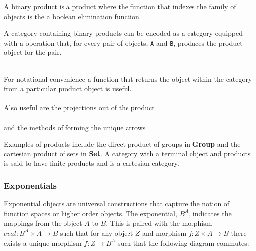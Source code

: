 
A binary product is a product where the function that indexes the family of
objects is the a boolean elimination function


A category containing binary products can be encoded as a category equipped with
a operation that, for every pair of objects, \verb|A| and \verb|B|, produces the
product object for the pair.

\begin{AgdaMultiCode}
\\
For notational convenience a function that returns the object within the
category from a particular product object is useful.\\
\\
Also useful are the projections out of the product \\
 \\
and the methods of forming the unique arrows \\
\end{AgdaMultiCode}

Examples of products include the direct-product of groups in \textbf{Group} and
the cartesian product of sets in \textbf{Set}. A category with a terminal object
and products is said to have finite products and is a cartesian category.

\subsubsection{Exponentials}

Exponential objects are universal constructions that capture the notion of
function spaces or higher order objects. The exponential, $B^{A}$, indicates the
mappings from the object $A$ to $B$. This is paired with the morphism $eval:
B^{A} \times A \rightarrow B$ such that for any object $Z$ and morphism $f :
Z\times A \rightarrow B$ there exists a unique morphism $\tilde{f}: Z
\rightarrow B^{A}$ such that the following diagram commutes:


